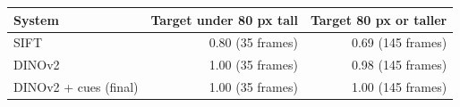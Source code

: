\begin{tabular}{lrr}
\toprule
System & Target under 80 px tall & Target 80 px or taller \\
\midrule
SIFT & 0.80 (35 frames) & 0.69 (145 frames) \\
DINOv2 & 1.00 (35 frames) & 0.98 (145 frames) \\
DINOv2 + cues (final) & 1.00 (35 frames) & 1.00 (145 frames) \\
\bottomrule
\end{tabular}
